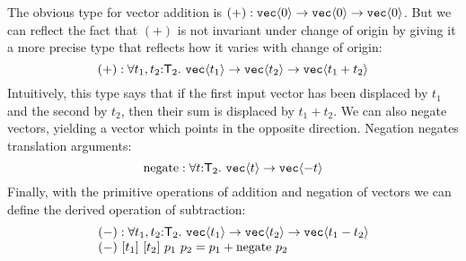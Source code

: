 The obvious type for vector addition is
$  (+) : \textup{\texttt{vec}}\langle 0 \rangle \to \textup{\texttt{vec}}\langle 0 \rangle \to \textup{\texttt{vec}}\langle 0 \rangle$.
But we can reflect the fact that $(+)$ is not invariant under change
of origin by giving it a more precise type that reflects how it varies
with change of origin:
\begin{displaymath}
  (+) : \forall t_1, t_2 \mathord: \SynTransl{2}.\ \tyPrim{vec}{t_1}
  \to \tyPrim{vec}{t_2} \to \tyPrim{vec}{t_1 + t_2}
\end{displaymath}
Intuitively, this type says that if the first input vector has been
displaced by $t_1$ and the second by $t_2$, then their sum is
displaced by $t_1 + t_2$. We can also negate vectors, yielding a
vector which points in the opposite direction. Negation negates
translation arguments:
\begin{displaymath}
  \mathrm{negate} : \forall t \mathord:
  \mathsf{T}_2.\ \textup{\texttt{vec}}\langle t \rangle \to \textup{\texttt{vec}}\langle -t \rangle
\end{displaymath}
Finally, with the primitive operations of addition and negation of
vectors we can define the derived operation of subtraction:
\begin{displaymath}
  \begin{array}{l}
    (-) : \forall t_1,t_2 \mathord:\mathsf{T}_2.\ \textup{\texttt{vec}}\langle t_1 \rangle
    \to \textup{\texttt{vec}}\langle t_2 \rangle \to \textup{\texttt{vec}}\langle t_1 - t_2 \rangle
    \\ (-)\ [t_1]\ [t_2]\ p_1\ p_2 = p_1 + \mathrm{negate}\ p_2
  \end{array}
\end{displaymath}

